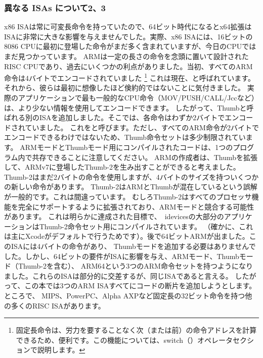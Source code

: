 \subsubsection{異なる \ac{ISA}s について2、3}
x86 \ac{ISA}は常に可変長命令を持っていたので、64ビット時代になるとx64拡張は\ac{ISA}に非常に大きな影響を与えませんでした。実際、x86 \ac{ISA}には、16ビットの8086 CPUに最初に登場した命令がまだ多く含まれていますが、今日のCPUではまだ見つかっています。 ARMは一定の長さの命令を念頭に置いて設計された\ac{RISC} \ac{CPU}であり、過去にいくつかの利点がありました。当初、すべてのARM命令は4バイトでエンコードされていました
\footnote{固定長命令は、労力を要することなく次（または前）の命令アドレスを計算できるため、便利です。この機能については、switch（）オペレータセクションで説明します。}
これは現在、と呼ばれています。それから、彼らは最初に想像したほど倹約的ではないことに気付きました。
実際のアプリケーションで最も一般的な\ac{CPU}命令（MOV/PUSH/CALL/Jccなど）は、より少ない情報を使用してエンコードできます。
したがって、Thumbと呼ばれる別の\ac{ISA}を追加しました。そこでは、各命令はわずか2バイトでエンコードされていました。
これをと呼びます。ただし、すべてのARM命令が2バイトでエンコードできるわけではないため、Thumb命令セットは多少制限されています。 
ARMモードとThumbモード用にコンパイルされたコードは、1つのプログラム内で共存できることに注意してください。 
ARMの作成者は、Thumbを拡張して、ARMv7に登場したThumb-2を生み出すことができると考えました。 
Thumb-2はまだ2バイトの命令を使用しますが、4バイトのサイズを持ついくつかの新しい命令があります。 
Thumb-2はARMとThumbが混在しているという誤解が一般的です。これは間違っています。
むしろThumb-2はすべてのプロセッサ機能を完全にサポートするように拡張されており、ARMモードと競合する可能性があります。
これは明らかに達成された目標で、\ idevicesの大部分のアプリケーションはThumb-2命令セット用にコンパイルされています。 
（確かに、これは主にXcodeがデフォルトで行うためです）。後で64ビットARMが出ました。この\ac{ISA}には4バイトの命令があり、
Thumbモードを追加する必要はありませんでした。しかし、64ビットの要件が\ac{ISA}に影響を与え、ARMモード、Thumbモード（Thumb-2を含む）、
ARM64という3つのARM命令セットを持つようになりました。これらの\ac{ISA}は部分的に交差するが、同じ\ac{ISA}であると言える。
したがって、この本では3つのARM \ac{ISA}すべてにコードの断片を追加しようとします。
ところで、
%
%
%
MIPS、PowerPC、Alpha AXPなど固定長の32ビット命令を持つ他の多くの\ac{RISC} \ac{ISA}があります。
